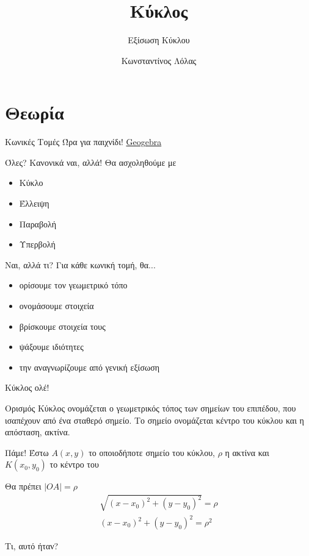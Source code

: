 \documentclass{presentation}
\title{Κύκλος}
\subtitle{Εξίσωση Κύκλου}
\author[Λόλας]{Κωνσταντίνος Λόλας}
\date{}
\begin{document}
\begin{frame}
  \titlepage
\end{frame}

\section{Θεωρία}
\begin{frame}{Κωνικές Τομές}
  Ώρα για παιχνίδι!
  \href{https://www.geogebra.org/m/pCg8NFVT}{Geogebra}
\end{frame}

\begin{frame}{Όλες? Κανονικά ναι, αλλά!}
  Θα ασχοληθούμε με
  \begin{itemize}
    \item Κύκλο
    \item Έλλειψη
    \item Παραβολή
    \item Υπερβολή
  \end{itemize}
\end{frame}

\begin{frame}{Ναι, αλλά τι?}
  Για κάθε κωνική τομή, θα...
  \begin{itemize}
    \item<1-> ορίσουμε τον γεωμετρικό τόπο
    \item<2-> ονομάσουμε στοιχεία
    \item<3-> βρίσκουμε στοιχεία τους
    \item<4-> ψάξουμε ιδιότητες
    \item<5-> την αναγνωρίζουμε από γενική εξίσωση
  \end{itemize}
\end{frame}

\begin{frame}{Κύκλος ολέ!}
  \begin{block}{Ορισμός}
    Κύκλος ονομάζεται ο γεωμετρικός τόπος των σημείων του επιπέδου, που ισαπέχουν από ένα σταθερό σημείο. Το σημείο ονομάζεται κέντρο του κύκλου και η απόσταση, ακτίνα.
  \end{block}
\end{frame}

\begin{frame}{Πάμε!}
   Έστω $A(x,y)$ το οποιοδήποτε σημείο του κύκλου, $ρ$ η ακτίνα και $Κ(x_0,y_0)$ το κέντρο του

   Θα πρέπει $|ΟΑ|=ρ$
  \begin{align*}
    \sqrt{(x-x_0)^2+(y-y_0)^2}=ρ \\
    (x-x_0)^2+(y-y_0)^2=ρ^2
  \end{align*}

   Τι, αυτό ήταν?

\end{frame}
\end{document}
